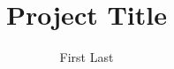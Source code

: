 \documentclass[a4paper,titlepage]{article}
\begin{document}
\title{Project Title}
\author{First Last}
\maketitle

\begin{abstract}
	
\end{abstract}

\tableofcontents
\listoftables
\listoffigures

\pagebreak


\end{document}

